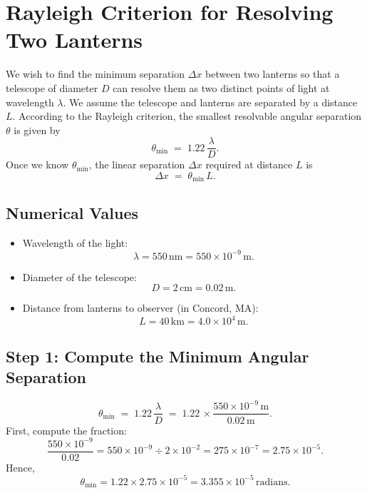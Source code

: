 \documentclass[12pt]{article}
\title{}
\author{Jerich Lee}
\date{\today}
\theoremstyle{definition} %
\theoremstyle{plain} %
\begin{document}
\maketitle



\section*{Rayleigh Criterion for Resolving Two Lanterns}

We wish to find the minimum separation \( \Delta x \) between two lanterns so that 
a telescope of diameter \( D \) can resolve them as two distinct points of light at 
wavelength \( \lambda \).  We assume the telescope and lanterns are separated by a distance 
\( L \).  According to the Rayleigh criterion, the smallest resolvable angular separation 
\( \theta \) is given by
\[
    \theta_\mathrm{min} \;=\; 1.22 \,\frac{\lambda}{D}.
\]
Once we know \( \theta_\mathrm{min} \), the linear separation \( \Delta x \) required at 
distance \( L \) is 
\[
    \Delta x \;=\; \theta_\mathrm{min}\,L.
\]

\subsection*{Numerical Values}

\begin{itemize}
  \item Wavelength of the light:
    \[
       \lambda = 550\,\text{nm} 
               = 550 \times 10^{-9}\,\text{m}.
    \]
  \item Diameter of the telescope:
    \[
       D = 2\,\text{cm} 
          = 0.02\,\text{m}.
    \]
  \item Distance from lanterns to observer (in Concord, MA):
    \[
       L = 40\,\text{km} 
          = 4.0 \times 10^{4}\,\text{m}.
    \]
\end{itemize}

\subsection*{Step 1: Compute the Minimum Angular Separation}

\[
    \theta_\mathrm{min}
    \;=\; 1.22 \,\frac{ \lambda }{ D }
    \;=\; 1.22 \,\times \frac{ 550 \times 10^{-9}\,\mathrm{m} }{ 0.02\,\mathrm{m} }.
\]
First, compute the fraction:
\[
   \frac{550 \times 10^{-9}}{0.02}
   = 550 \times 10^{-9} \div 2 \times 10^{-2}
   = 275 \times 10^{-7}
   = 2.75 \times 10^{-5}.
\]
Hence,
\[
    \theta_\mathrm{min}
    = 1.22 \times 2.75 \times 10^{-5}
    = 3.355 \times 10^{-5}\,\mathrm{radians}.
\]
\end{document}
